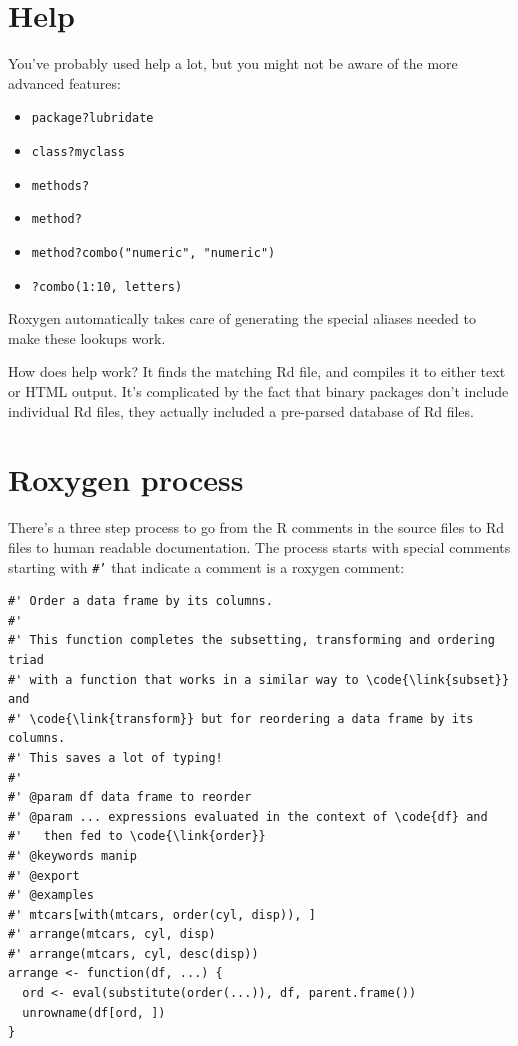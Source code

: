 \section{Help}

You've probably used help a lot, but you might not be aware of the more
advanced features:

\begin{itemize}
\itemsep1pt\parskip0pt
\item
  \texttt{package?lubridate}
\item
  \texttt{class?myclass}
\item
  \texttt{methods?}
\item
  \texttt{method?}
\item
  \texttt{method?combo("numeric", "numeric")}
\item
  \texttt{?combo(1:10, letters)}
\end{itemize}

Roxygen automatically takes care of generating the special aliases
needed to make these lookups work.

How does help work? It finds the matching Rd file, and compiles it to
either text or HTML output. It's complicated by the fact that binary
packages don't include individual Rd files, they actually included a
pre-parsed database of Rd files.

\section{Roxygen process}

There's a three step process to go from the R comments in the source
files to Rd files to human readable documentation. The process starts
with special comments starting with \texttt{\#'} that indicate a comment
is a roxygen comment:

\begin{verbatim}
#' Order a data frame by its columns.
#'
#' This function completes the subsetting, transforming and ordering triad
#' with a function that works in a similar way to \code{\link{subset}} and 
#' \code{\link{transform}} but for reordering a data frame by its columns.
#' This saves a lot of typing!
#'
#' @param df data frame to reorder
#' @param ... expressions evaluated in the context of \code{df} and 
#'   then fed to \code{\link{order}}
#' @keywords manip
#' @export
#' @examples
#' mtcars[with(mtcars, order(cyl, disp)), ]
#' arrange(mtcars, cyl, disp)
#' arrange(mtcars, cyl, desc(disp))
arrange <- function(df, ...) {
  ord <- eval(substitute(order(...)), df, parent.frame())
  unrowname(df[ord, ])
}
\end{verbatim}

